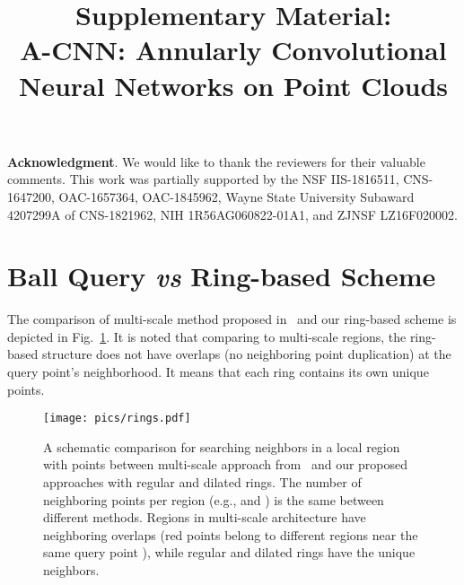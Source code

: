 \documentclass[10pt,twocolumn,letterpaper]{article}
\begin{document}
\vspace{1mm}
\noindent
\textbf{Acknowledgment}. We would like to thank the reviewers for their valuable comments. This work was partially supported by the NSF IIS-1816511, CNS-1647200, OAC-1657364, OAC-1845962, Wayne State University Subaward 4207299A of CNS-1821962, NIH 1R56AG060822-01A1, and ZJNSF LZ16F020002.
{\small


}

\clearpage
\pagebreak
\appendix

\title{Supplementary Material:\\A-CNN: Annularly Convolutional Neural Networks on Point Clouds\vspace{-13mm}}
\author{}


\makeatletter
\newcommand{\settitle}{\@maketitle}
\makeatother

\maketitle


\section{Ball Query \emph{vs} Ring-based Scheme}
\label{sec:suppl_ball_vs_ring_comparison}
The comparison of multi-scale method proposed in~\cite{qi2017pointnet++} and our ring-based scheme is depicted in Fig.~\ref{fig:dilated_rings}. It is noted that comparing to multi-scale regions, the ring-based structure does not have overlaps (no neighboring point duplication) at the query point's neighborhood. It means that each ring contains its own unique points.
\vspace{-2.5mm}
\begin{figure}[h]
\begin{center}
\texttt{[image: pics/rings.pdf]}\vspace{-3.5mm}
\end{center}
\caption{A schematic comparison for searching neighbors in a local region with  points between multi-scale approach from~\cite{qi2017pointnet++} and our proposed approaches with regular and dilated rings. The number of neighboring points per region (e.g.,  and ) is the same between different methods. Regions in multi-scale architecture have neighboring overlaps (red points belong to different regions near the same query point ), while regular and dilated rings have the unique neighbors.
\vspace{-3.5mm}
}
\centering
\label{fig:dilated_rings}
\end{figure}
\end{document}

